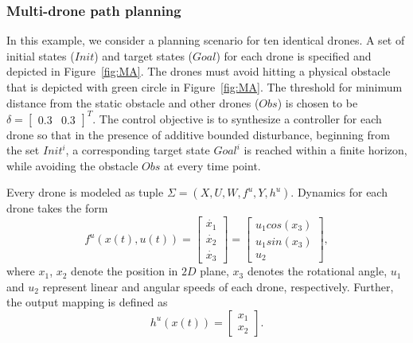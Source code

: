 \subsubsection{Multi-drone path planning}\label{sec:Multirobot}
In this example, we consider a planning scenario for ten identical drones. A set of initial states ($Init$) and target states ($Goal$) for each drone is specified and depicted in Figure~\ref{fig:MA}. The drones must avoid hitting a physical obstacle that is depicted with green circle in Figure~\ref{fig:MA}. %
The threshold for minimum distance from the static obstacle and other drones ($Obs$) is chosen to be $\delta=\begin{bmatrix}0.3&0.3\end{bmatrix}^T$. %
The control objective is to synthesize a controller for each drone so that in the presence of additive bounded disturbance, beginning from the set $Init^i$, a corresponding target state $Goal^i$ is reached within a finite horizon, while avoiding the obstacle $Obs$ at every time point. 

Every drone is modeled as tuple $\Sigma=(X,U,W,f^u,Y,h^u)$. %
Dynamics for each drone takes the form
\begin{equation*}\label{eq:unicycle_ss}
	f^{u}(x(t),u(t))=
	\begin{bmatrix}
		\dot{x_1}\\
		\dot{x_2}\\
		\dot{x_3}
	\end{bmatrix}=
	\begin{bmatrix}
		u_1cos(x_3)\\
		u_1sin(x_3)\\
		u_2
	\end{bmatrix},
\end{equation*}
where $x_1$, $x_2$ denote the position in $2D$ plane, $x_3$ denotes the rotational angle, $u_1$ and $u_2$ represent linear and angular speeds of each drone, respectively. Further, the output mapping is defined as
\[
h^u(x(t))=\begin{bmatrix}
	x_1\\x_2
\end{bmatrix}.
\]


